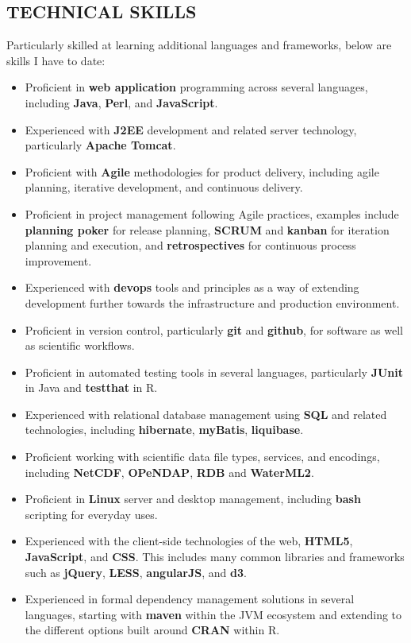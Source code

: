 \documentclass[line,margin]{res}
\begin{document}
\begin{resume}
\section{TECHNICAL SKILLS}
	Particularly skilled at learning additional languages and frameworks, below are skills I have to date:
\begin{itemize}
	\item Proficient in \textbf{web application} programming across several languages, including \textbf{Java}, \textbf{Perl}, and \textbf{JavaScript}.
	\item Experienced with \textbf{J2EE} development and related server technology, particularly \textbf{Apache Tomcat}.
	\item Proficient with \textbf{Agile} methodologies for product delivery, including agile planning, iterative development, and continuous delivery.
	\item Proficient in project management following Agile practices, examples include \textbf{planning poker} for release planning, \textbf{SCRUM} and \textbf{kanban} for iteration planning and execution, and \textbf{retrospectives} for continuous process improvement.
	\item Experienced with \textbf{devops} tools and principles as a way of extending development further towards the infrastructure and production environment.
	\item Proficient in version control, particularly \textbf{git} and \textbf{github}, for software as well as scientific workflows.
	\item Proficient in automated testing tools in several languages, particularly \textbf{JUnit} in Java and \textbf{testthat} in R.
	\item Experienced with relational database management using \textbf{SQL} and related technologies, including \textbf{hibernate}, \textbf{myBatis}, \textbf{liquibase}.
	\item Proficient working with scientific data file types, services, and encodings, including \textbf{NetCDF}, \textbf{OPeNDAP}, \textbf{RDB} and \textbf{WaterML2}.
	\item Proficient in \textbf{Linux} server and desktop management, including \textbf{bash} scripting for everyday uses.
	\item Experienced with the client-side technologies of the web, \textbf{HTML5}, \textbf{JavaScript}, and \textbf{CSS}.  This includes many common libraries and frameworks such as \textbf{jQuery}, \textbf{LESS}, \textbf{angularJS}, and \textbf{d3}.
	\item Experienced in formal dependency management solutions in several languages, starting with \textbf{maven} within the JVM ecosystem and extending to the different options built around \textbf{CRAN} within R.

\end{itemize}
\end{resume}
\end{document}

